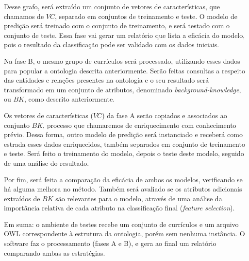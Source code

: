 Desse grafo, será extraído um conjunto de vetores de características, que chamamos de $VC$, separado em conjuntos de treinamento e teste. O modelo de predição será treinado com o conjunto de treinamento, e será testado com o conjunto de teste. Essa fase vai gerar um relatório que lista a eficácia do modelo, pois o resultado da classificação pode ser validado com os dados iniciais.

Na fase B, o mesmo grupo de currículos será processado, utilizando esses dados para popular a ontologia descrita anteriormente. Serão feitas consultas a respeito das entidades e relações presentes na ontologia e o seu resultado será transformado em um conjunto de atributos, denominado \textit{background-knowledge}, ou $BK$, como descrito anteriormente.

Os vetores de características ($VC$) da fase A serão copiados e associados ao conjunto $BK$, processo que chamaremos de enriquecimento com conhecimento prévio. Dessa forma, outro modelo de predição será instanciado e receberá como estrada esses dados enriquecidos, também separados em conjunto de treinamento e teste. Será feito o treinamento do modelo, depois o teste deste modelo, seguido de uma análise do resultado.

Por fim, será feita a comparação da eficácia de ambos os modelos, verificando se há alguma melhora no método. Também será avaliado se os atributos adicionais extraídos de $BK$ são relevantes para o modelo, através de uma análise da importância relativa de cada atributo na classificação final (\textit{feature selection}).

Em suma: o ambiente de testes recebe um conjunto de currículos e um arquivo OWL correspondente à estrutura da ontologia, porém sem nenhuma instância. O software faz o processamento (fases A e B), e gera ao final um relatório comparando ambas as estratégias.
